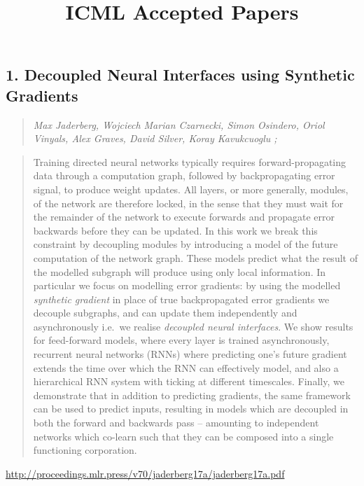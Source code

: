 \documentclass{article}
\title{\textbf{ICML Accepted Papers}}
\begin{document}
\maketitle
\tableofcontents
\pagebreak
\subsection{1. Decoupled Neural Interfaces using Synthetic Gradients}

\begin{quote}
\footnotesize{\textit{Max Jaderberg, Wojciech Marian Czarnecki, Simon Osindero, Oriol Vinyals, Alex Graves, David Silver, Koray Kavukcuoglu ;}}

\end{quote}

\begin{quote}
    Training directed neural networks typically requires forward-propagating data through a computation graph, followed by backpropagating error signal, to produce weight updates. All layers, or more generally, modules, of the network are therefore locked, in the sense that they must wait for the remainder of the network to execute forwards and propagate error backwards before they can be updated. In this work we break this constraint by decoupling modules by introducing a model of the future computation of the network graph. These models predict what the result of the modelled subgraph will produce using only local information. In particular we focus on modelling error gradients: by using the modelled \textit{synthetic gradient} in place of true backpropagated error gradients we decouple subgraphs, and can update them independently and asynchronously i.e.\ we realise \textit{decoupled neural interfaces}. We show results for feed-forward models, where every layer is trained asynchronously, recurrent neural networks (RNNs) where predicting one’s future gradient extends the time over which the RNN can effectively model, and also a hierarchical RNN system with ticking at different timescales. Finally, we demonstrate that in addition to predicting gradients, the same framework can be used to predict inputs, resulting in models which are decoupled in both the forward and backwards pass – amounting to independent networks which co-learn such that they can be composed into a single functioning corporation.  
\end{quote}

\href{http://proceedings.mlr.press/v70/jaderberg17a/jaderberg17a.pdf}{http://proceedings.mlr.press/v70/jaderberg17a/jaderberg17a.pdf}
\end{document}
